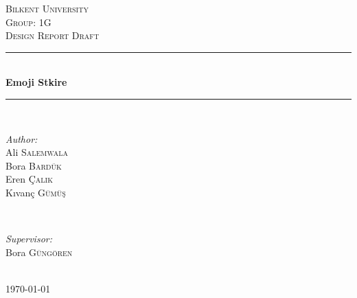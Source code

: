 \documentclass[12pt]{article} %
\begin{document}

\begin{titlepage}

\setcounter{secnumdepth}{5}

\newcommand{\HRule}{\rule{\linewidth}{0.5mm}} %

\center %

\textsc{\LARGE Bilkent University}\\[1.5cm] %
\textsc{\Large Group: 1G}\\[0.5cm] %
\textsc{\large Design Report Draft}\\[0.5cm] %

\HRule \\[0.4cm]
{ \huge \bfseries Emoji Stkire }\\ %
\HRule \\[1.5cm]

\begin{minipage}{0.4\textwidth}
\begin{flushleft} \large
\emph{Author:}\\
Ali \textsc{Salemwala} 
\\ Bora \textsc{Bardük}
\\ Eren \textsc{Çalık}
\\ Kıvanç \textsc{Gümüş}
\end{flushleft}
\end{minipage}
~
\begin{minipage}{0.4\textwidth}
\begin{flushright} \large
\emph{Supervisor:} \\
Bora \textsc{Güngören} %
\end{flushright}
\end{minipage}\\[4cm]

{\large \today}\\[3cm] %


\vfill %

\end{titlepage}
\end{document}
